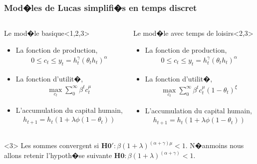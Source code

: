 \documentclass[10pt, hyperref={pdfpagemode=FullScreen}]{beamer} %
\begin{document}
\begin{frame}
\transdissolve
\begin{block}{}
\end{block}
\end{frame}


\begin{frame}
\frametitle{Mod�les de Lucas simplifi�s en temps discret}
     \begin{columns}
    \column{5.5cm}
\begin{block}{\scriptsize{Le mod�le basique}}<1,2,3>
\begin{itemize}
\item La fonction de production,
\begin{eqnarray*}
0 \leq c_{t} \leq y_{t} = h_{t}^{\gamma} (\theta_{t}h_{t})^{\alpha}
\end{eqnarray*}
\item La fonction d'utilit�,
\begin{eqnarray*}
\max_{c_{t}} \sum_{0}^{\infty} \beta^{t} c_{t}^{\mu}
\end{eqnarray*}
\item L'accumulation du capital humain,
\begin{eqnarray*}
h_{t+1} = h_{t} (1+\lambda \phi(1-\theta_{t}))
\end{eqnarray*}
\end{itemize}
\end{block}

\column{5.5cm}
\begin{block}{\scriptsize{Le mod�le avec temps de loisirs}}<2,3>
\begin{itemize}
\item La fonction de production,
\begin{eqnarray*}
0 \leq c_{t} \leq y_{t} = h_{t}^{\gamma} (\theta_{t}h_{t})^{\alpha}
\end{eqnarray*}
\item La fonction d'utilit�,
\begin{eqnarray*}
\max_{c_{t}} \sum_{0}^{\infty} \beta^{t} c_{t}^{\mu} (1-\theta_{t})^{\xi}
\end{eqnarray*}
\item L'accumulation du capital humain,
\begin{eqnarray*}
h_{t+1} = h_{t} (1+\lambda \phi(1-\theta_{t}))
\end{eqnarray*}
\end{itemize}
\end{block}
\end{columns}


\begin{block}{}<3>
Les sommes convergent si $\mathbf{H0' :} \beta(1+\lambda)^{(\alpha+\gamma)\mu}<1$. N�anmoins nous allons retenir l'hypoth�se suivante $\mathbf{H0 :} \beta(1+\lambda)^{(\alpha+\gamma)}<1$.
\end{block}
\end{frame}
\end{document}
